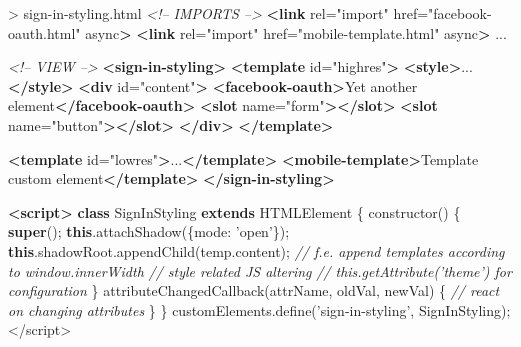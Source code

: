 \documentclass[]{article}
\newenvironment{Shaded}{}{}
\newcommand{\KeywordTok}[1]{\textcolor[rgb]{0.00,0.44,0.13}{\textbf{{#1}}}}
\newcommand{\DataTypeTok}[1]{\textcolor[rgb]{0.56,0.13,0.00}{{#1}}}
\newcommand{\FloatTok}[1]{\textcolor[rgb]{0.25,0.63,0.44}{{#1}}}
\newcommand{\StringTok}[1]{\textcolor[rgb]{0.25,0.44,0.63}{{#1}}}
\newcommand{\SpecialStringTok}[1]{\textcolor[rgb]{0.73,0.40,0.53}{{#1}}}
\newcommand{\CommentTok}[1]{\textcolor[rgb]{0.38,0.63,0.69}{\textit{{#1}}}}
\newcommand{\OtherTok}[1]{\textcolor[rgb]{0.00,0.44,0.13}{{#1}}}
\newcommand{\VariableTok}[1]{\textcolor[rgb]{0.10,0.09,0.49}{{#1}}}
\newcommand{\OperatorTok}[1]{\textcolor[rgb]{0.40,0.40,0.40}{{#1}}}
\newcommand{\AttributeTok}[1]{\textcolor[rgb]{0.49,0.56,0.16}{{#1}}}
\newcommand{\NormalTok}[1]{{#1}}
\begin{document}
\begin{Shaded}
\begin{Highlighting}[]
\NormalTok{> sign-in-styling.html}
\CommentTok{<!-- IMPORTS -->}
\KeywordTok{<link}\OtherTok{ rel=}\StringTok{"import"}\OtherTok{ href=}\StringTok{"facebook-oauth.html"}\OtherTok{ async}\KeywordTok{>}
\KeywordTok{<link}\OtherTok{ rel=}\StringTok{"import"}\OtherTok{ href=}\StringTok{"mobile-template.html"}\OtherTok{ async}\KeywordTok{>}
\NormalTok{...}

\CommentTok{<!-- VIEW -->}
\KeywordTok{<sign-in-styling>}
  \KeywordTok{<template}\OtherTok{ id=}\StringTok{"highres"}\KeywordTok{>}
    \KeywordTok{<style>}\FloatTok{...}\KeywordTok{</style>}
    \KeywordTok{<div}\OtherTok{ id=}\StringTok{"content"}\KeywordTok{>}
      \KeywordTok{<facebook-oauth>}\NormalTok{Yet another element}\KeywordTok{</facebook-oauth>}
      \KeywordTok{<slot}\OtherTok{ name=}\StringTok{"form"}\KeywordTok{></slot>}
      \KeywordTok{<slot}\OtherTok{ name=}\StringTok{"button"}\KeywordTok{></slot>}
    \KeywordTok{</div>}
  \KeywordTok{</template>}
  
  \KeywordTok{<template}\OtherTok{ id=}\StringTok{"lowres"}\KeywordTok{>}\NormalTok{...}\KeywordTok{</template>}
  \KeywordTok{<mobile-template>}\NormalTok{Template custom element}\KeywordTok{</template>}
\KeywordTok{</sign-in-styling>}

\KeywordTok{<script>}
  \KeywordTok{class} \NormalTok{SignInStyling }\KeywordTok{extends} \NormalTok{HTMLElement }\OperatorTok{\{}
    \AttributeTok{constructor}\NormalTok{() }\OperatorTok{\{}
      \KeywordTok{super}\NormalTok{()}\OperatorTok{;}
      \KeywordTok{this}\NormalTok{.}\AttributeTok{attachShadow}\NormalTok{(}\OperatorTok{\{}\DataTypeTok{mode}\OperatorTok{:} \StringTok{'open'}\OperatorTok{\}}\NormalTok{)}\OperatorTok{;}
      \KeywordTok{this}\NormalTok{.}\VariableTok{shadowRoot}\NormalTok{.}\AttributeTok{appendChild}\NormalTok{(}\VariableTok{temp}\NormalTok{.}\AttributeTok{content}\NormalTok{)}\OperatorTok{;}
      \CommentTok{// f.e. append templates according to window.innerWidth}
      \CommentTok{// style related JS altering}
      \CommentTok{// this.getAttribute('theme') for configuration}
    \OperatorTok{\}}
    \AttributeTok{attributeChangedCallback}\NormalTok{(attrName}\OperatorTok{,} \NormalTok{oldVal}\OperatorTok{,} \NormalTok{newVal) }\OperatorTok{\{}
      \CommentTok{// react on changing attributes}
    \OperatorTok{\}}
  \OperatorTok{\}}
  \VariableTok{customElements}\NormalTok{.}\AttributeTok{define}\NormalTok{(}\StringTok{'sign-in-styling'}\OperatorTok{,} \NormalTok{SignInStyling)}\OperatorTok{;}
\OperatorTok{<}\SpecialStringTok{/script>}
\end{Highlighting}
\end{Shaded}
\end{document}
